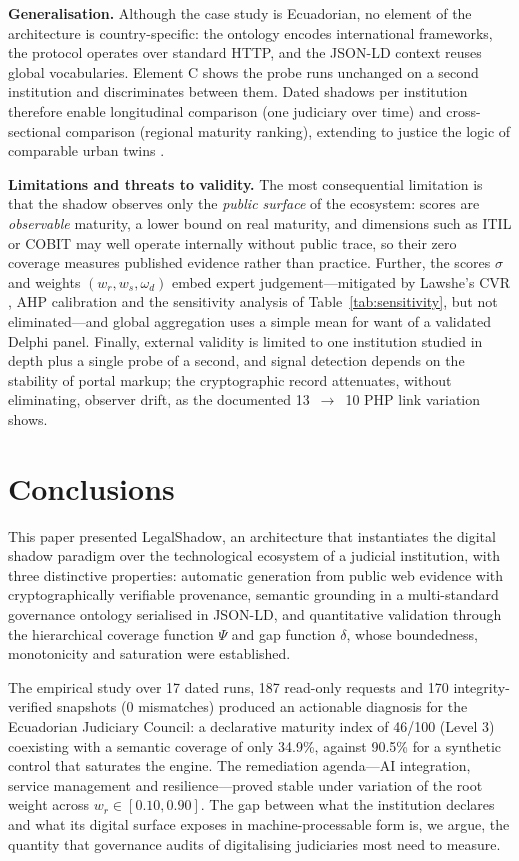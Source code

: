 \documentclass[engproc,article,submit,moreauthors]{Definitions/mdpi}
\begin{document}
\textbf{Generalisation.} Although the case study is Ecuadorian, no element of the architecture is country-specific: the ontology encodes international frameworks, the protocol operates over standard HTTP, and the JSON-LD context reuses global vocabularies. Element C shows the probe runs unchanged on a second institution and discriminates between them. Dated shadows per institution therefore enable longitudinal comparison (one judiciary over time) and cross-sectional comparison (regional maturity ranking), extending to justice the logic of comparable urban twins \cite{Shahat2021}.

\textbf{Limitations and threats to validity.} The most consequential limitation is that the shadow observes only the \emph{public surface} of the ecosystem: scores are \emph{observable} maturity, a lower bound on real maturity, and dimensions such as ITIL or COBIT may well operate internally without public trace, so their zero coverage measures published evidence rather than practice. Further, the scores $\sigma$ and weights $(w_r,w_s,\omega_d)$ embed expert judgement---mitigated by Lawshe's CVR \cite{Lawshe1975}, AHP calibration \cite{Saaty1990} and the sensitivity analysis of Table~\ref{tab:sensitivity}, but not eliminated---and global aggregation uses a simple mean for want of a validated Delphi panel. Finally, external validity is limited to one institution studied in depth plus a single probe of a second, and signal detection depends on the stability of portal markup; the cryptographic record attenuates, without eliminating, observer drift, as the documented 13~$\rightarrow$~10 PHP link variation shows.

\section{Conclusions}
\label{sec:conclusions}

This paper presented LegalShadow, an architecture that instantiates the digital shadow paradigm over the technological ecosystem of a judicial institution, with three distinctive properties: automatic generation from public web evidence with cryptographically verifiable provenance, semantic grounding in a multi-standard governance ontology serialised in JSON-LD, and quantitative validation through the hierarchical coverage function $\Psi$ and gap function $\delta$, whose boundedness, monotonicity and saturation were established.

The empirical study over 17 dated runs, 187 read-only requests and 170 integrity-verified snapshots (0 mismatches) produced an actionable diagnosis for the Ecuadorian Judiciary Council: a declarative maturity index of 46/100 (Level 3) coexisting with a semantic coverage of only 34.9\%, against 90.5\% for a synthetic control that saturates the engine. The remediation agenda---AI integration, service management and resilience---proved stable under variation of the root weight across $w_r \in [0.10,0.90]$. The gap between what the institution declares and what its digital surface exposes in machine-processable form is, we argue, the quantity that governance audits of digitalising judiciaries most need to measure.
\end{document}
